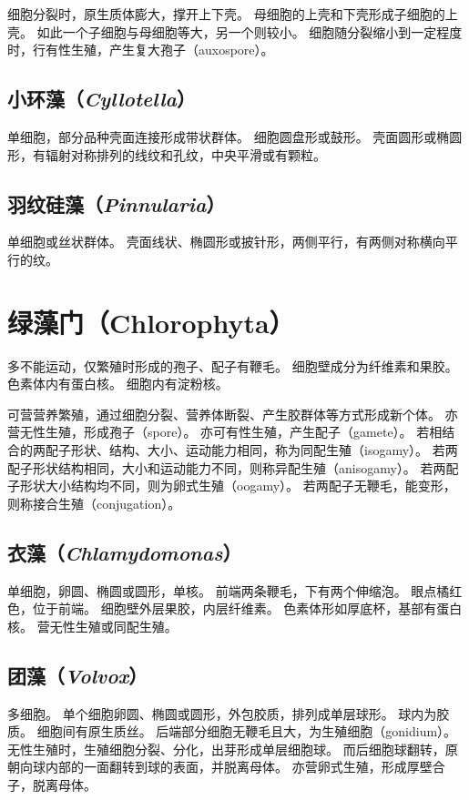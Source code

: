 \documentclass[11pt]{article}
\begin{document}
\newline

细胞分裂时，原生质体膨大，撑开上下壳。
母细胞的上壳和下壳形成子细胞的上壳。
如此一个子细胞与母细胞等大，另一个则较小。
细胞随分裂缩小到一定程度时，行有性生殖，产生复大孢子（auxospore）。

\subsection{小环藻（\textit{Cyllotella}）}
单细胞，部分品种壳面连接形成带状群体。
细胞圆盘形或鼓形。
壳面圆形或椭圆形，有辐射对称排列的线纹和孔纹，中央平滑或有颗粒。

\subsection{羽纹硅藻（\textit{Pinnularia}）}
单细胞或丝状群体。
壳面线状、椭圆形或披针形，两侧平行，有两侧对称横向平行的纹。

\section{绿藻门（Chlorophyta）}
多不能运动，仅繁殖时形成的孢子、配子有鞭毛。
细胞壁成分为纤维素和果胶。
色素体内有蛋白核。
细胞内有淀粉核。

\newline

可营营养繁殖，通过细胞分裂、营养体断裂、产生胶群体等方式形成新个体。
亦营无性生殖，形成孢子（spore）。
亦可有性生殖，产生配子（gamete）。
若相结合的两配子形状、结构、大小、运动能力相同，称为同配生殖（isogamy）。
若两配子形状结构相同，大小和运动能力不同，则称异配生殖（anisogamy）。
若两配子形状大小结构均不同，则为卵式生殖（oogamy）。
若两配子无鞭毛，能变形，则称接合生殖（conjugation）。

\subsection{衣藻（\textit{Chlamydomonas}）}
单细胞，卵圆、椭圆或圆形，单核。
前端两条鞭毛，下有两个伸缩泡。
眼点橘红色，位于前端。
细胞壁外层果胶，内层纤维素。
色素体形如厚底杯，基部有蛋白核。
营无性生殖或同配生殖。

\subsection{团藻（\textit{Volvox}）}
多细胞。
单个细胞卵圆、椭圆或圆形，外包胶质，排列成单层球形。
球内为胶质。
细胞间有原生质丝。
后端部分细胞无鞭毛且大，为生殖细胞（gonidium）。
无性生殖时，生殖细胞分裂、分化，出芽形成单层细胞球。
而后细胞球翻转，原朝向球内部的一面翻转到球的表面，并脱离母体。
亦营卵式生殖，形成厚壁合子，脱离母体。
\end{document}
